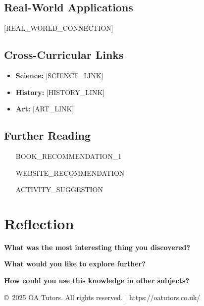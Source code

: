 \documentclass[a4paper,12pt]{article}
\begin{document}
\subsection{Real-World Applications}
[REAL_WORLD_CONNECTION]

\subsection{Cross-Curricular Links}
\begin{itemize}
    \item \textbf{Science:} [SCIENCE_LINK]
    \item \textbf{History:} [HISTORY_LINK] 
    \item \textbf{Art:} [ART_LINK]
\end{itemize}

\subsection{Further Reading}
\begin{itemize}
    \item [BOOK_RECOMMENDATION_1]
    \item [WEBSITE_RECOMMENDATION]
    \item [ACTIVITY_SUGGESTION]
\end{itemize}

\section{Reflection}

\textbf{What was the most interesting thing you discovered?}

\vspace{2cm}

\textbf{What would you like to explore further?}

\vspace{2cm}

\textbf{How could you use this knowledge in other subjects?}

\vspace{2cm}

\vfill
\begin{center}
\textcolor{oagray}{\small \copyright\ 2025 OA Tutors. All rights reserved. | https://oatutors.co.uk/}
\end{center}
\end{document}
